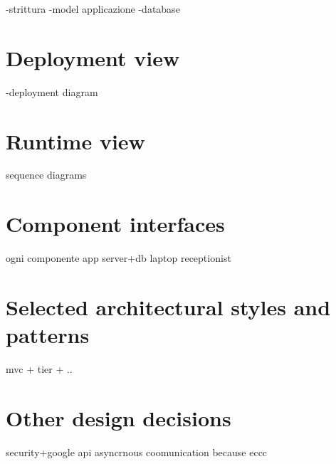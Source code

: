 -strittura
-model applicazione
-database


\section{Deployment view}
-deployment diagram

\section{Runtime view}
sequence diagrams

\section{Component interfaces}
ogni componente
app
server+db
laptop receptionist

\section{Selected architectural styles and patterns}
mvc + tier + ..

\section{Other design decisions}

security+google api
asyncrnous coomunication because eccc
